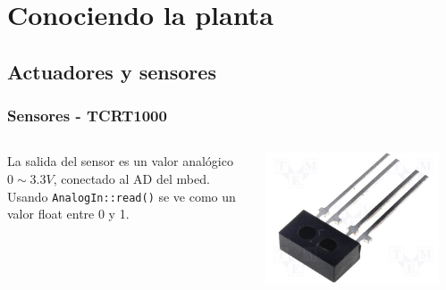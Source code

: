 \documentclass[compress]{beamer}
\begin{document}
\section{Conociendo la planta}

\subsection{Actuadores y sensores}
\begin{frame}[fragile]
 \frametitle{Sensores - TCRT1000}
\begin{columns}
La salida del sensor es un valor analógico $0 \sim 3.3V$, conectado al AD del mbed. Usando \verb|AnalogIn::read()| se ve 
como un valor float entre 0 y 1.
\begin{center}
 \includegraphics[width=0.3\columnwidth]{./img/tccrt1000.jpg}
\end{center}
\begin{center}

\end{center}
\end{columns}
\end{frame}
\end{document}
